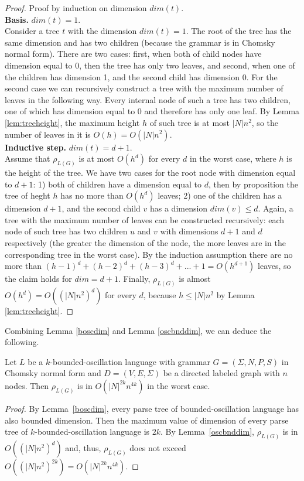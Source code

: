 \begin{proof}
Proof by induction on dimension $dim(t)$.
\\
\textbf{Basis.} $dim(t) = 1$.
\\
Consider a tree $t$ with the dimension $dim(t) = 1$. The root of the tree has the same dimension and has two children (because the grammar is in Chomsky normal form). There are two cases:  first, when both of child nodes have dimension equal to 0, then the tree has only two leaves, and second, when one of the children has dimension 1, and the second child has dimension 0. For the second case we can recursively construct a tree with the maximum number of leaves in the following way. Every internal node of such a tree has two children, one of which has dimension equal to 0 and therefore has only one leaf. By Lemma \ref{lem:treeheight}, the maximum height $h$ of such tree is at most $|N|n^2$, so the number of leaves in it is $O(h) = O(|N|n^2)$.
\\
\textbf{Inductive step.} $dim(t) = d + 1$.
\\
Assume that $\rho_{L(G)}$ is at most $O(h^{d})$ for every $d$ in the worst case, where $h$ is the height of the tree. We have two cases for the root node with dimension equal to $d+1$: 1) both of children have a dimension equal to $d$, then by proposition the tree of heght $h$ has no more than $O(h^{d})$ leaves; 2) one of the children has a dimension $d + 1$, and the second child $v$ has a dimension $dim(v) \le d$. Again, a tree with the maximum number of leaves can be constructed recursively:  each node of such tree has two children $u$ and $v$ with dimensions $d+1$ and $d$ respectively (the greater the dimension of the node, the more leaves are in the corresponding tree in the worst case). By the induction assumption there are no more than $(h-1)^d + (h-2)^d + (h-3)^d + ... + 1 = O(h^{d+1})$ leaves, so the claim holds for $dim = d+1$. Finally, $\rho_{L(G)}$ is almost $O(h^{d}) = O({(|N|n^2)}^d)$ for every $d$, because $h \le |N|n^2$ by Lemma \ref{lem:treeheight}. 
\end{proof}
Combining Lemma \ref{boscdim} and Lemma \ref{oscbnddim}, we can deduce the following.
\begin{theorem}
\label{oscbndosc}
Let $L$ be a $k$-bounded-oscillation language with grammar $G = (\Sigma, N, P, S)$ in Chomsky normal form and $D=(V, E, \Sigma)$ be a directed labeled graph with $n$ nodes. Then $\rho_{L(G)}$ is in $O({|N|}^{2k}n^{4k})$ in the worst case.
\end{theorem}
\begin{proof}
By Lemma~\ref{boscdim}, every parse tree of bounded-oscillation language has also bounded dimension. Then the maximum value of dimension of every parse tree of $k$-bounded-oscillation language is $2k$. By Lemma~\ref{oscbnddim}, $\rho_{L(G)}$ is in $O({(|N|n^2)}^d)$ and, thus, $\rho_{L(G)}$ does not exceed $O({(|N|n^2)}^{2k}) = O({|N|}^{2k}n^{4k})$.
\end{proof}

